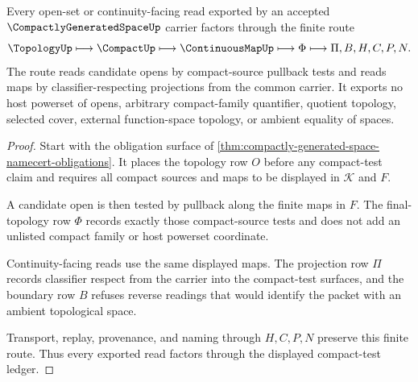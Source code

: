 \begin{theorem}\label{thm:compactly-generated-space-compact-test-route}
Every open-set or continuity-facing read exported by an accepted $\CompactlyGeneratedSpaceUp$ carrier factors through the finite route
$$
\TopologyUp \longmapsto \CompactUp \longmapsto \ContinuousMapUp \longmapsto \Phi \longmapsto \Pi,B,H,C,P,N .
$$
The route reads candidate opens by compact-source pullback tests and reads maps by classifier-respecting projections from the common carrier. It exports no host powerset of opens, arbitrary compact-family quantifier, quotient topology, selected cover, external function-space topology, or ambient equality of spaces.
\end{theorem}
\begin{proof}
Start with the obligation surface of \autoref{thm:compactly-generated-space-namecert-obligations}. It places the topology row $O$ before any compact-test claim and requires all compact sources and maps to be displayed in $\mathcal K$ and $F$.

A candidate open is then tested by pullback along the finite maps in $F$. The final-topology row $\Phi$ records exactly those compact-source tests and does not add an unlisted compact family or host powerset coordinate.

Continuity-facing reads use the same displayed maps. The projection row $\Pi$ records classifier respect from the carrier into the compact-test surfaces, and the boundary row $B$ refuses reverse readings that would identify the packet with an ambient topological space.

Transport, replay, provenance, and naming through $H,C,P,N$ preserve this finite route. Thus every exported read factors through the displayed compact-test ledger.
\end{proof}

